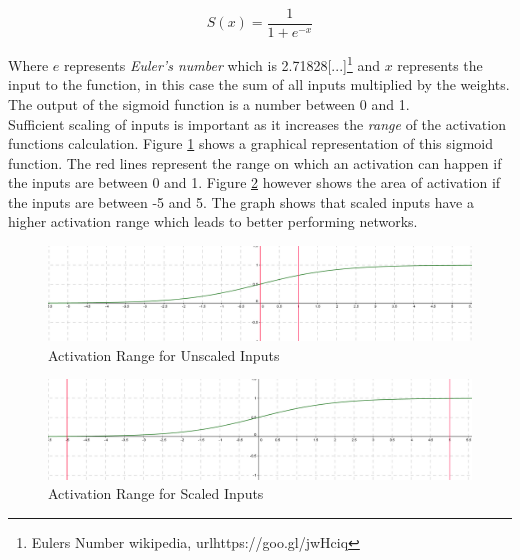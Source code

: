 \begin{equation}
S(x) = \frac{1}{1 + e^{-x}}
\end{equation} 

Where $e$ represents \textit{Euler's number} which is 2.71828[...]\footnote{Eulers Number wikipedia, url{https://goo.gl/jwHciq}} and $x$ represents the input to the function, in this case the sum of all inputs multiplied by the weights.
The output of the sigmoid function is a number between 0 and 1.\\

Sufficient scaling of inputs is important as it increases the \textit{range} of the activation functions calculation. 
Figure  \ref{fig:unscaled} shows a graphical representation of  this sigmoid function. The red lines represent the range on which an activation can happen if the inputs are between 0 and 1. Figure \ref{fig:scaled} however shows the area of activation if the inputs are between -5 and 5. The graph shows that scaled inputs have a higher activation range which leads to better performing networks. 

\begin{figure}[h]
\begin{center}
\includegraphics[scale=0.4]{Chapter2/images/unscaled.PNG}
\caption[Activation Range for Unscaled Inputs]{Activation Range for Unscaled Inputs\footnotemark}
\label{fig:unscaled}
\end{center}
\end{figure}
\begin{figure}[h]
\begin{center}
\includegraphics[scale=0.4]{Chapter2/images/scaled.PNG}
\caption[Activation Range for Scaled Inputs]{Activation Range for Scaled Inputs\footnotemark}
\label{fig:scaled}
\end{center}
\end{figure}

